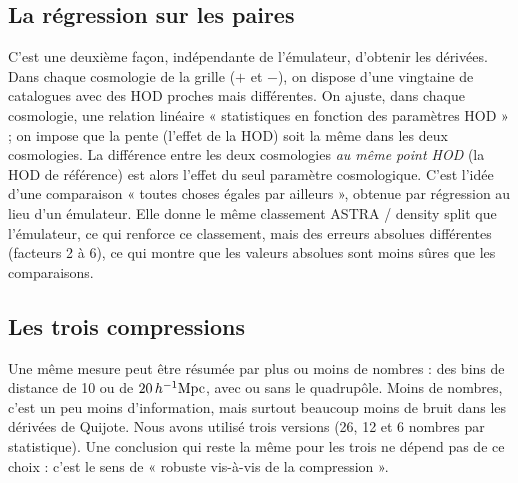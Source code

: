 \subsection{La régression sur les paires}
C'est une deuxième façon, indépendante de l'émulateur, d'obtenir les dérivées. Dans chaque cosmologie de la grille ($+$ et $-$), on dispose d'une vingtaine de catalogues avec des HOD proches mais différentes. On ajuste, dans chaque cosmologie, une relation linéaire « statistiques en fonction des paramètres HOD » ; on impose que la pente (l'effet de la HOD) soit la même dans les deux cosmologies. La différence entre les deux cosmologies \emph{au même point HOD} (la HOD de référence) est alors l'effet du seul paramètre cosmologique. C'est l'idée d'une comparaison « toutes choses égales par ailleurs », obtenue par régression au lieu d'un émulateur. Elle donne le même classement ASTRA / density split que l'émulateur, ce qui renforce ce classement, mais des erreurs absolues différentes (facteurs 2 à 6), ce qui montre que les valeurs absolues sont moins sûres que les comparaisons.

\subsection{Les trois compressions}
Une même mesure peut être résumée par plus ou moins de nombres : des bins de distance de 10 ou de $20\,h^{-1}\mathrm{Mpc}$, avec ou sans le quadrupôle. Moins de nombres, c'est un peu moins d'information, mais surtout beaucoup moins de bruit dans les dérivées de Quijote. Nous avons utilisé trois versions (26, 12 et 6 nombres par statistique). Une conclusion qui reste la même pour les trois ne dépend pas de ce choix : c'est le sens de « robuste vis-à-vis de la compression ».

